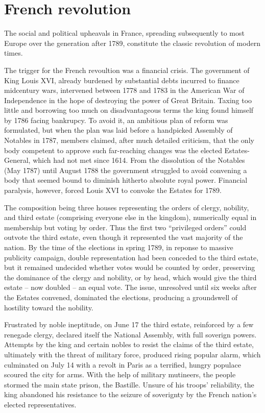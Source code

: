 \documentclass[
  openany]{book}
\begin{document}
\hypertarget{french-revolution}{%
\section{French revolution}\label{french-revolution}}

The social and political upheavals in France, spreading subsequently to most Europe over the generation after 1789, constitute the classic revolution of modern times.

The trigger for the French revoultion was a financial crisis. The government of King Louis XVI, already burdened by substantial debts incurred to finance midcentury wars, intervened between 1778 and 1783 in the American War of Independence in the hope of destroying the power of Great Britain. Taxing too little and borrowing too much on disadvantageous terms the king found himself by 1786 facing bankrupcy. To avoid it, an ambitious plan of reform was formulated, but when the plan was laid before a handpicked Assembly of Notables in 1787, members claimed, after much detailed criticism, that the only body competent to approve such far-reaching changes was the elected Estates-General, which had not met since 1614. From the dissolution of the Notables (May 1787) until August 1788 the government struggled to avoid convening a body that seemed bound to diminish hitherto absolute royal power. Financial paralysis, however, forced Louis XVI to convoke the Estates for 1789.

The composition being three houses representing the orders of clergy, nobility, and third estate (comprising everyone else in the kingdom), numerically equal in membership but voting by order. Thus the first two ``privileged orders'' could outvote the third estate, even though it represented the vast majority of the nation. By the time of the elections in spring 1789, in reponse to massive publicity campaign, double representation had been conceded to the third estate, but it remained undecided whether votes would be counted by order, preserving the dominance of the clergy and nobility, or by head, which would give the third estate -- now doubled -- an equal vote. The issue, unresolved until six weeks after the Estates convened, dominated the elections, producing a groundswell of hostility toward the nobility.

Frustrated by noble ineptitude, on June 17 the third estate, reinforced by a few renegade clergy, declared itself the National Assembly, with full soverign powers. Attempts by the king and certain nobles to resist the claims of the third estate, ultimately with the threat of military force, produced rising popular alarm, which culminated on July 14 with a revolt in Paris as a terrified, hungry populace scoured the city for arms. With the help of military mutineers, the people stormed the main state prison, the Bastille. Unsure of his troops' reliability, the king abandoned his resistance to the seizure of soverignty by the French nation's elected representatives.
\end{document}
